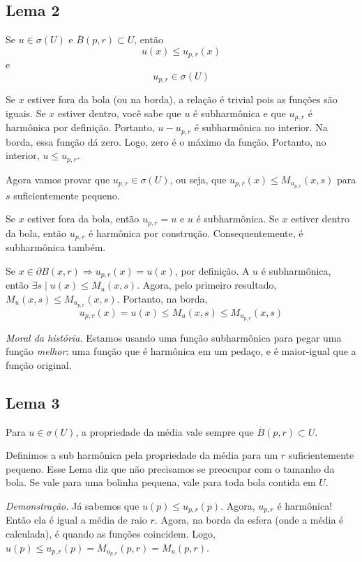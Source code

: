 \documentclass[11pt]{article}
\newcommand{\p}{\partial}
\begin{document}
\subsection*{Lema 2}

Se \(u \in \sigma(U)\) e \(\overline{B}(p,r) \subset U\), então \[u(x) \leq u_{p,r} (x)\] e \[u_{p,r} \in \sigma(U)\]

Se \(x\) estiver fora da bola (ou na borda), a relação é trivial pois as funções são iguais. Se \(x\) estiver dentro, você sabe que \(u\) é subharmônica e que \(u_{p,r}\) é harmônica por definição. Portanto, \(u - u_{p,r}\) é subharmônica no interior. Na borda, essa função dá zero. Logo, zero é o máximo da função. Portanto, no interior, \(u \leq u _{p,r}\).

Agora vamos provar que \(u_{p,r} \in \sigma(U)\), ou seja, que \(u_{p,r} (x) \leq M_{u_{p,r}}(x,s)\) para \(s\) suficientemente pequeno.

Se \(x\) estiver fora da bola, então \(u_{p,r} = u\) e \(u\) é subharmônica. Se \(x\) estiver dentro da bola, então \(u_{p,r}\) é harmônica por construção. Consequentemente, é subharmônica também.

Se \(x \in \p B(x,r) \Rightarrow u_{p,r}(x) = u(x)\), por definição. A \(u\) é subharmônica, então \(\exists s \mid u(x) \leq M_u (x,s)\). Agora, pelo primeiro resultado, \(M_u(x,s)\leq M_{u_{p,r}}(x,s)\). Portanto, na borda, \[ u_{p,r}(x) = u(x) \leq  M_u (x,s) \leq M_{u_{p,r}}(x,s)\]

\textit{Moral da história.} Estamos usando uma função subharmônica para pegar uma função \textit{melhor}: uma função que é harmônica em um pedaço, e é maior-igual que a função original.

\subsection*{Lema 3}

Para \(u \in \sigma(U)\), a propriedade da média vale sempre que \(\overline{B}(p,r)\subset U\).

Definimos a sub harmônica pela propriedade da média para um \(r\) suficientemente pequeno. Esse Lema diz que não precisamos se preocupar com o tamanho da bola. Se vale para uma bolinha pequena, vale para toda bola contida em \(U\).

\textit{Demonstração.} Já sabemos que \(u(p) \leq u_{p,r}(p) \). Agora, \(u_{p,r}\) é harmônica! Então ela é igual a média de raio \(r\). Agora, na borda da esfera (onde a média é calculada), é quando as funções coincidem. Logo, \(u(p) \leq u_{p,r}(p) = M_{u_{p,r}}(p,r) = M_u (p,r)\). 
\end{document}
